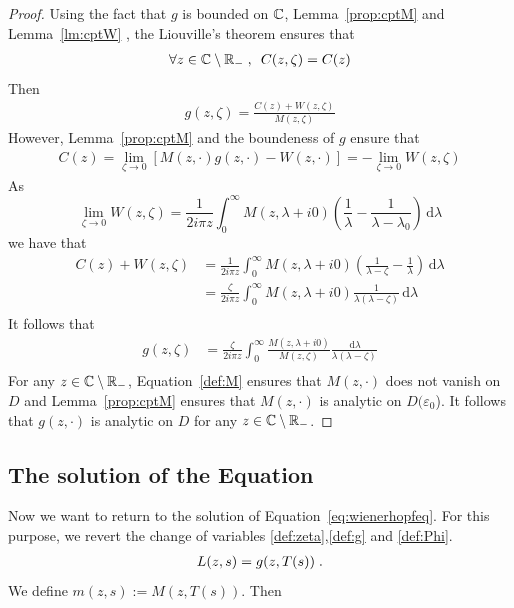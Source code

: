 \documentclass[11pt]{amsart}
\newcommand{\diff}{\,\mathrm{d}}
\begin{document}
\begin{proof}
Using the fact that $g$ is bounded on $\mathbb{C}$, Lemma~\ref{prop:cptM} and Lemma~\ref{lm:cptW}
, the Liouville's theorem ensures that
\begin{align*}
    \forall z \in \mathbb{C} \setminus \mathbb{R}_-
    \; , \enspace
    C(z,\zeta) = C(z)
\end{align*}
Then 
\begin{align}
    g(z,\zeta) = \frac{C(z)+W(z,\zeta)}{M(z,\zeta)}
\end{align}
However, Lemma~\ref{prop:cptM} and the boundeness of $g$ ensure that
\begin{align}
C(z) 
= \lim_{\zeta \to 0}[M(z,\cdot)g(z,\cdot) - W(z,\cdot)] 
= -\lim_{\zeta \to 0}W(z,\zeta)
\end{align}
As
$$ \lim_{\zeta \to 0}W(z,\zeta) 
= \frac{1}{2i\pi z}\int_0^\infty  {M(z,\lambda+i0)}\left( \frac{1}{\lambda} - \frac{1}{\lambda-\lambda_0}\right) \diff \lambda $$
we have that
\begin{align*}
    C(z) + W(z,\zeta)
    &= 
    \frac{1}{2i \pi z}\int_0^\infty  {M(z,\lambda+i0)}\left( \frac{1}{\lambda-\zeta}-\frac{1}{\lambda}\right) \diff \lambda \\
    &= 
    \frac{\zeta}{2i\pi z}\int_0^\infty  {M(z,\lambda+i0)}\frac{1}{\lambda(\lambda-\zeta)} \diff \lambda \\
\end{align*}
It follows that 
\begin{align*}
    g(z,\zeta) 
    &= 
    \frac{\zeta}{2i \pi z}\int_0^\infty  \frac{M(z,\lambda+i0)}{M(z,\zeta)} \frac{\diff \lambda}{\lambda(\lambda-\zeta)} \\
\end{align*}
For any $z \in \mathbb{C} \setminus \mathbb{R}_-$, Equation~\eqref{def:M} ensures that $M(z, \cdot)$ does not vanish on $D$ and Lemma~\ref{prop:cptM} ensures that $M(z, \cdot)$ is analytic on $D(\varepsilon_0$). It follows that $g(z, \cdot)$ is analytic on $D$ for any $z \in \mathbb{C} \setminus \mathbb{R}_-$.

\end{proof}

\subsection{The solution of the Equation}
Now we want to return to the solution of Equation~\eqref{eq:wienerhopfeq}. For this purpose, we revert the change of variables \eqref{def:zeta},\eqref{def:g} and \eqref{def:Phi}.
\begin{align}
    L(z,s) = g(z, T(s)) 
    \; .
\end{align}
We define $m(z,s) := M(z, T(s))$. Then
\end{document}
